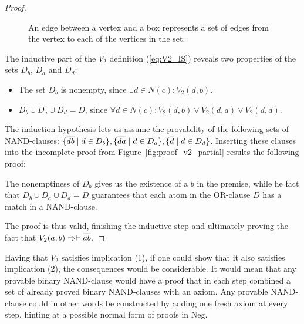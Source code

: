 \begin{proof}
\begin{figure}[!h]
{    An edge between a vertex and a box represents a set of edges from the vertex to each of the vertices in the set.}
    \label{fig:v2_situation}
  \end{figure}
  \FloatBarrier
  The inductive part of the $V_2$ definition (\ref{eq:V2_IS}) reveals two properties of the sets $D_b$, $D_a$ and $D_d$:
  \begin{itemize}
    \item The set $D_b$ is nonempty, since $\exists d \in N(c): V_2(d,b)$.
    \item $D_b \cup D_a \cup D_d = D$, since $\forall d \in N(c): V_2(d,b) \vee V_2(d,a) \vee V_2(d,d)$.
  \end{itemize}
  The induction hypothesis lets us assume the provability of the following sets of NAND-clauses:
  $\{ \ol{db} \;|\; d \in D_b \},\{ \ol{da} \;|\; d \in D_a \},\{ \ol{d} \;|\; d \in D_d \}$.
  Inserting these clauses into the incomplete proof from Figure~\ref{fig:proof_v2_partial} results the following proof:\par
  \begin{figure}[!h]
    \centering
    \begin{prooftree*}
    \end{prooftree*}
    \caption{}
    \label{fig:proof_v2}
  \end{figure}
The nonemptiness of $D_b$ gives us the existence of a $b$ in the premise, while he fact that $D_b \cup D_a \cup D_d = D$ guarantees that each atom in the OR-clause $D$ has a match in a NAND-clause.

The proof is thus valid, finishing the inductive step and ultimately proving the fact that $V_2(a,b) \Rightarrow \vdash \ol{ab}$.
\end{proof}
Having that $V_2$ satisfies implication (1), if one could show that it also satisfies implication (2), the consequences would be considerable.
It would mean that any provable binary NAND-clause would have a proof that in each step combined a set of already proved binary NAND-clauses with an axiom.
Any provable NAND-clause could in other words be constructed by adding one fresh axiom at every step, hinting at a possible normal form of proofs in Neg.


